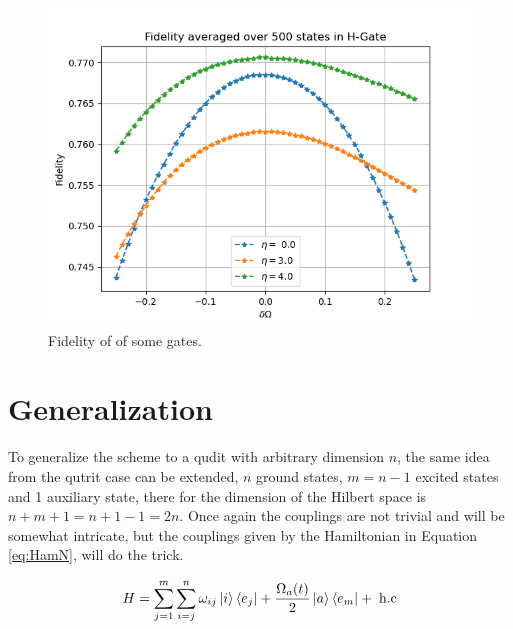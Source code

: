\begin{figure}[H]
\includegraphics[scale=0.45]{figures/fid-H-gate.png}
\caption{Fidelity of of some gates.}


\end{figure}


\newpage
\section{Generalization}
To generalize the scheme to a qudit with arbitrary dimension $n$,  the same idea from the qutrit case can be extended, $n$ ground states, $m = n - 1$ excited states and 1 auxiliary state, there for the dimension of the Hilbert space is  $n + m + 1 = n + 1 -1 = 2n$. Once again the couplings are not trivial and will be somewhat intricate, but the couplings given by the Hamiltonian in Equation \ref{eq:HamN}, will do the trick. 

\begin{equation}
H = \sum_{j = 1}^m \sum_{i = j}^n \omega_{ij} \ket{i}\bra{e_j} + \frac{\Omega_a(t)}{2}\ket{a}\bra{e_m} +\;\text{h.c}
\label{eq:HamN}
\end{equation}

